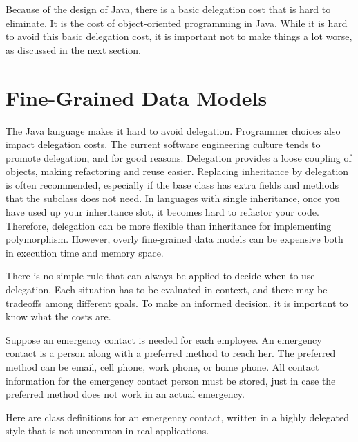 Because of the design of Java, there is a basic delegation cost that is hard to eliminate. It is the cost of object-oriented programming in Java. While it is hard to avoid this basic delegation cost, it is important not to make things a lot worse, as discussed in the next section. 

\section{Fine-Grained Data Models}
\label{fine-grained-data-models}

The Java language makes it hard to avoid delegation. Programmer choices also impact delegation costs.  The current software engineering culture tends to promote delegation, and for good reasons. Delegation provides a loose coupling of objects, making refactoring and reuse easier. Replacing inheritance by delegation is often recommended, especially if the base class has extra fields and methods that the subclass does not need. In languages with single inheritance, once you have used up your inheritance slot, it becomes hard to refactor your code. Therefore, delegation can be more flexible than inheritance for implementing polymorphism. However, overly fine-grained data models can be expensive both in execution time and memory space. 

There is no simple rule that can always be applied to decide when to use delegation. Each situation has to be evaluated in context, and there may be tradeoffs among different goals. To make an informed decision, it is important to know what the costs are.

\begin{example} 
Suppose an emergency contact is needed for each employee. An emergency contact is a person along with a preferred method to reach her.  The preferred method can be email, cell phone, work phone, or home phone. All contact information for the emergency contact person must be stored, just in case the preferred method does not work in an actual emergency. 
\end{example}
Here are class definitions for an emergency contact, written in a highly delegated style that is not uncommon in real applications. 

